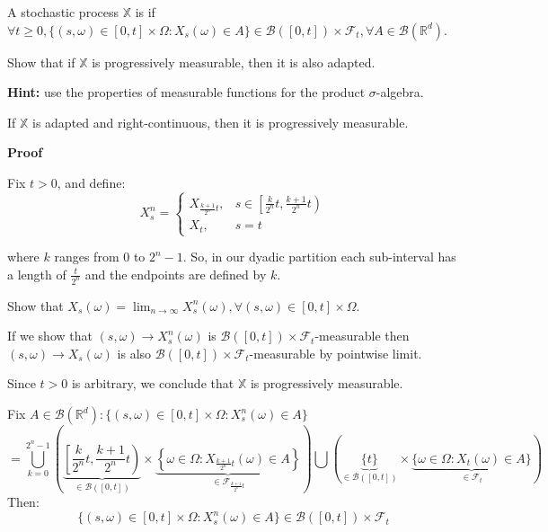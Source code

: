 \begin{definition}
    A stochastic process $\mathbb{X}$ is  if $\forall t \geq 0, \{(s, \omega) \in [0,t] \times \Omega: X_{s}(\omega) \in A\} \in \mathcal{B}([0,t]) \times \mathcal{F}_{t}, \forall A \in \mathcal{B}(\mathbb{R}^{d})$.
\end{definition}

\begin{homework}
    Show that if $\mathbb{X}$ is progressively measurable, then it is also adapted.

    \textbf{Hint:} use the properties of measurable functions for the product $\sigma$-algebra.
\end{homework}

\begin{proposition}
    If $\mathbb{X}$ is adapted and right-continuous, then it is progressively measurable. 
\end{proposition}

\textbf{Proof}

Fix $t > 0$, and define: 
$$X_{s}^{n}= \begin{cases} 
X_{\frac{k+1}{2^{n}}t},& s \in \left[\frac{k}{2^{n}}t, \frac{k+1}{2^{n}}t \right) 
\\ X_{t}, & s=t
\end{cases}$$

where $k$ ranges from $0$ to $2^{n}-1$. So, in our dyadic partition each sub-interval has a length of $\frac{t}{2^{n}}$
and the endpoints are defined by $k$.

\begin{homework}
    Show that $X_{s}(\omega)= \lim_{n \to \infty} X^{n}_{s}(\omega),  \forall (s,\omega) \in [0,t] \times \Omega$.
\end{homework}

If we show that $(s,\omega) \to X^{n}_{s}(\omega)$ is $\mathcal{B}([0,t]) \times \mathcal{F}_{t}$-measurable then $(s,\omega) \to X_{s}(\omega)$ is also $\mathcal{B}([0,t]) \times \mathcal{F}_{t}$-measurable by pointwise limit.

Since $t > 0$ is arbitrary, we conclude that $\mathbb{X}$ is progressively measurable. 

Fix $A \in \mathcal{B}(\mathbb{R}^{d}): \{(s, \omega) \in [0,t] \times \Omega: X_{s}^{n}(\omega) \in A\}$
$$= \bigcup^{2^{n}-1}_{k=0} \left( \underbrace{\left[\frac{k}{2^{n}}t, \frac{k+1}{2^{n}}t \right)}_{\in \mathcal{B}([0,t])} \times  \underbrace{\left\{ \omega \in \Omega: X_{\frac{k+1}{2^{n}}t}(\omega) \in A \right\}}_{\in \mathcal{F}_{\frac{k+1}{2^n}t}}  \right)  \bigcup \left(\underbrace{\{t\}}_{\in \mathcal{B}([0,t])} \times \underbrace{\{\omega \in \Omega: X_{t}(\omega) \in A\}}_{\in \mathcal{F}_t}   \right)$$
Then:
$$\{(s, \omega) \in [0,t] \times \Omega: X_{s}^{n}(\omega) \in A\} \in \mathcal{B}([0,t]) \times \mathcal{F}_{t}$$

